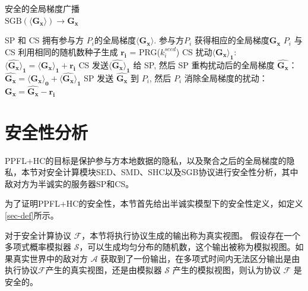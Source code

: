 \begin{algorithm}[htbp]
	\caption{安全的全局梯度广播 \\$\text{SGB}(\boldsymbol{\langle G_x\rangle}) \rightarrow \boldsymbol{G_x}$}
	\label{alg4}
	\begin{algorithmic}[1]
		\REQUIRE SP 和 CS 拥有参与方 $P_i$的全局梯度$\boldsymbol{\langle G_x\rangle}$.
		\ENSURE 参与方$P_i$ 获得相应的全局梯度$\boldsymbol{G_x}$
		\STATE $P_i$ 与 CS 利用相同的随机数种子生成 $\boldsymbol{r_i}$ = PRG($k_i^{seed}$) 
		\STATE CS 扰动$\boldsymbol{\langle G_x\rangle_1}$:\\ $\boldsymbol{\langle \widehat{G_x}\rangle_1} = \boldsymbol{\langle G_x\rangle_1} + \boldsymbol{r_i}$
		\STATE CS 发送$\boldsymbol{\langle \widehat{G_x}\rangle_1}$ 给 SP, 然后 SP 重构扰动后的全局梯度 $\boldsymbol{\widehat{G_x}}$：\\ $\boldsymbol{\widehat{G_x}} = \boldsymbol{\langle G_x\rangle_0} + \boldsymbol{\langle \widehat{G_x}\rangle_1}$
		\STATE SP 发送 $\boldsymbol{\widehat{G_x}}$ 到 $P_i$, 然后 $P_i$ 消除全局梯度的扰动：\\$\boldsymbol{G_x} = \boldsymbol{\widehat{G_x}} - \boldsymbol{r_i}$
	\end{algorithmic}
\end{algorithm}

\section{安全性分析}\label{4-analysis}
PPFL+HC的目标是保护参与方本地数据的隐私，以及聚合之后的全局梯度的隐私，本节对安全计算模块SED、SMD、SHC以及SGB协议进行安全性分析，其中敌对方为半诚实的服务器SP和CS。

为了证明PPFL+HC的安全性，本节首先给出半诚实模型下的安全性定义，如定义\ref{sec-def}所示。

\begin{definition}\label{sec-def}	
	对于安全计算协议 $\mathcal{F}$，本节将执行协议生成的输出称为真实视图。
	假设存在一个多项式概率模拟器 $\mathcal{S}$，可以生成均匀分布的随机数，这个输出被称为模拟视图。如果真实世界中的敌对方 $\mathcal{A}$ 获取到了一份输出，在多项式时间内无法区分输出是由执行协议$\mathcal{F}$产生的真实视图，还是由模拟器 $\mathcal{S}$ 产生的模拟视图，则认为协议 $\mathcal{F}$ 是安全的。
\end{definition}

